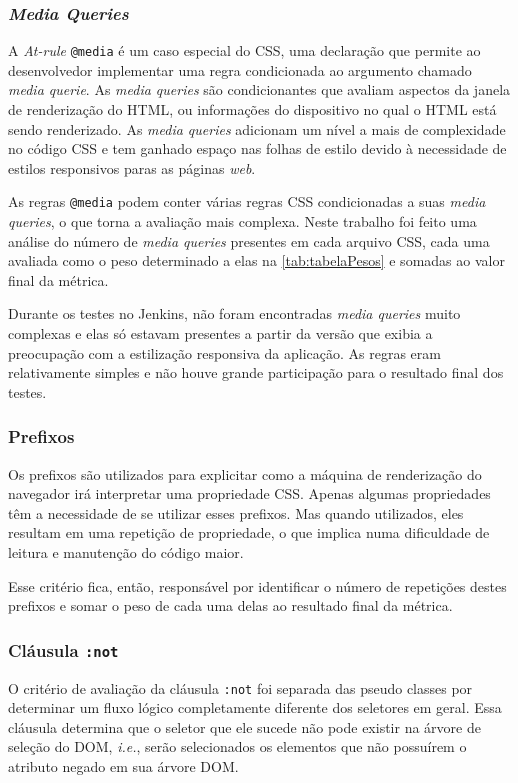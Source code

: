 \subsubsection{\textit{Media Queries}}
A \textit{At-rule} \texttt{@media} é um caso especial do CSS, uma declaração que permite ao desenvolvedor implementar uma regra condicionada ao argumento chamado \textit{media querie}. As \textit{media queries} são condicionantes que avaliam aspectos da janela de renderização do HTML, ou informações do dispositivo no qual o HTML está sendo renderizado. As \textit{media queries} adicionam um nível a mais de complexidade no código CSS e tem ganhado espaço nas folhas de estilo devido à necessidade de estilos responsivos paras as páginas \textit{web}. 

As regras \texttt{@media} podem conter várias regras CSS condicionadas a suas \textit{media queries}, o que torna a avaliação mais complexa. Neste trabalho foi feito uma análise do número de \textit{media queries} presentes em cada arquivo CSS, cada uma avaliada como o peso determinado a elas na \autoref{tab:tabelaPesos} e somadas ao valor final da métrica.

Durante os testes no Jenkins, não foram encontradas \textit{media queries} muito complexas e elas só estavam presentes a partir da versão que exibia a preocupação com a estilização responsiva da aplicação. As regras eram relativamente simples e não houve grande participação para o resultado final dos testes.

\subsubsection{Prefixos}
Os prefixos são utilizados para explicitar como a máquina de renderização do navegador irá interpretar uma propriedade CSS. Apenas algumas propriedades têm a necessidade de se utilizar esses prefixos. Mas quando utilizados, eles resultam em uma repetição de propriedade, o que implica numa dificuldade de leitura e manutenção do código maior.

Esse critério fica, então, responsável por identificar o número de repetições destes prefixos e somar o peso de cada uma delas ao resultado final da métrica.

\subsubsection{Cláusula \texttt{:not}}
O critério de avaliação da cláusula \texttt{:not} foi separada das pseudo classes por determinar um fluxo lógico completamente diferente dos seletores em geral. Essa cláusula determina que o seletor que ele sucede não pode existir na árvore de seleção do DOM, \textit{i.e.}, serão selecionados os elementos que não possuírem o atributo negado em sua árvore DOM.

